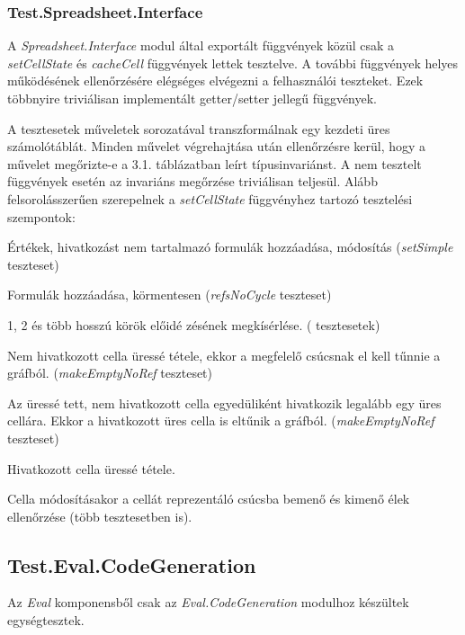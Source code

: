 \subsubsection{Test.Spreadsheet.Interface}

A \textit{Spreadsheet.Interface} modul által exportált függvények közül
csak a \textit{setCellState} és \textit{cacheCell} függvények lettek tesztelve. A további függvények helyes működésének ellenőrzésére elégséges elvégezni a felhasználói teszteket. Ezek többnyire triviálisan implementált getter/setter jellegű függvények.

A tesztesetek műveletek sorozatával transzformálnak egy kezdeti üres számolótáblát. Minden művelet végrehajtása után ellenőrzésre kerül, hogy a művelet megőrizte-e a 3.1. táblázatban leírt típusinvariánst. A nem tesztelt függvények esetén az invariáns megőrzése triviálisan teljesül.
Alább felsorolásszerűen szerepelnek a \textit{setCellState} függvényhez tartozó tesztelési szempontok:

\begin{compactenum}
	\item Értékek, hivatkozást nem tartalmazó formulák hozzáadása, módosítás (\textit{setSimple} teszteset)
	\item Formulák hozzáadása, körmentesen (\textit{refsNoCycle} teszteset)
	\item 1, 2 és több hosszú körök előidé	zésének megkísérlése. ( tesztesetek)
	\item Nem hivatkozott cella üressé tétele, ekkor a megfelelő csúcsnak el kell tűnnie a gráfból. (\textit{makeEmptyNoRef} teszteset)
	\item Az üressé tett, nem hivatkozott cella egyedüliként hivatkozik legalább egy üres cellára. Ekkor a hivatkozott üres cella is eltűnik a gráfból. (\textit{makeEmptyNoRef} teszteset)
	\item Hivatkozott cella üressé tétele.
	\item Cella módosításakor a cellát reprezentáló csúcsba bemenő és kimenő élek ellenőrzése (több tesztesetben is).
\end{compactenum}

\subsection{Test.Eval.CodeGeneration}

Az \textit{Eval} komponensből csak az \textit{Eval.CodeGeneration} modulhoz készültek egységtesztek. 

